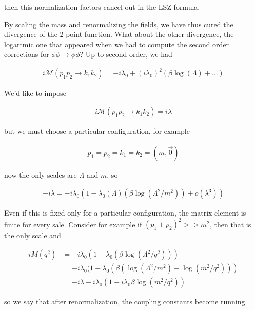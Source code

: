 \documentclass{report}
\begin{document}
then this normalization factors cancel out in the LSZ formula.



By scaling the mass and renormalizing the fields, we have thus cured the divergence of the 2 point function. What about the other divergence, the logartmic one that appeared when we had to compute the second order corrections for \(\phi\phi \rightarrow \phi\phi\)? Up to second order, we had 

\begin{align}
    i\mathcal{M}(p_1p_2 \rightarrow k_1k_2) = -i\lambda_0 + (i\lambda_0)^2(\beta \log(\Lambda) + \ldots)
\end{align}

We'd like to impose 

\begin{align}
    i\mathcal{M}(p_1p_2 \rightarrow k_1k_2) = i\lambda
\end{align}

but we must choose a particular configuration, for example 

\begin{align}
    p_1 = p_2 = k_1 = k_2 = (m, \vec{0})
\end{align}

now the only scales are \(\Lambda\) and \(m\), so 

\begin{align}
    -i\lambda = -i\lambda_0(1-\lambda_0(\Lambda)(\beta\log(\Lambda^2/m^2)) + o(\lambda^3))
\end{align}

Even if this is fixed only for a particular configuration, the matrix element is finite for every sale. Consider for example if \((p_1+p_2)^2 >> m^2 \), then that is the only scale and 

\begin{align}
    iM(q^2) &= -i\lambda_0(1-\lambda_0(\beta\log(\Lambda^2/q^2))) \\
    &= -i\lambda_0(1-\lambda_0(\beta(\log(\Lambda^2/m^2) - \log(m^2/q^2))) \\
    &= -i\lambda - i\lambda_0(1-i\lambda_0\beta\log(m^2/q^2))
\end{align}

so we say that after renormalization, the coupling constants become running. 
\end{document}
